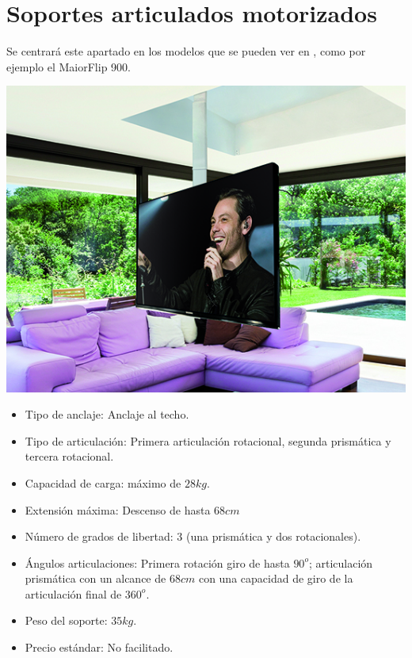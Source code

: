 \section{Soportes articulados motorizados}

Se centrará este apartado en los modelos que se pueden ver en \cite{maiormover:2018}, como por ejemplo el MaiorFlip 900.

\begin{minipage}{0.35\textwidth}
   \includegraphics[width=\linewidth]{figuras/Imagenes_EstadoArte/not_valid_1.jpg}
\end{minipage}
\begin{minipage}{0.65\textwidth}\raggedright
   \hspace{1cm}
   \begin{itemize}
       \item Tipo de anclaje: Anclaje al techo.
       \item Tipo de articulación: Primera articulación rotacional, segunda prismática y tercera rotacional.
       \item Capacidad de carga: máximo de $28kg$.
       \item Extensión máxima: Descenso de hasta $68cm$
       \item Número de grados de libertad: 3 (una prismática y dos rotacionales).
       \item Ángulos articulaciones: Primera rotación giro de hasta $90^o$; articulación prismática con un alcance de $68cm$ con una capacidad de giro de la articulación final de $360^o$.
       \item Peso del soporte: $35kg$.
       \item Precio estándar: No facilitado.
   \end{itemize}
\end{minipage}
\\


